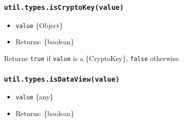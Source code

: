 \begin{Shaded}
\begin{Highlighting}[]
\NormalTok{(}\NormalTok{)}\OperatorTok{;} 
\NormalTok{(} \NormalTok{(}\NormalTok{))}\OperatorTok{;} 
\NormalTok{(}\NormalTok{(}\NormalTok{))}\OperatorTok{;} 
\NormalTok{(}\NormalTok{(}\NormalTok{(}\NormalTok{)))}\OperatorTok{;} 
\NormalTok{(}\NormalTok{(}\NormalTok{(}\NormalTok{)))}\OperatorTok{;} 
\end{Highlighting}
\end{Shaded}

\subsubsection{\texorpdfstring{\texttt{util.types.isCryptoKey(value)}}{util.types.isCryptoKey(value)}}\label{util.types.iscryptokeyvalue}

\begin{itemize}
\tightlist
\item
  \texttt{value} \{Object\}
\item
  Returns: \{boolean\}
\end{itemize}

Returns \texttt{true} if \texttt{value} is a \{CryptoKey\},
\texttt{false} otherwise.

\subsubsection{\texorpdfstring{\texttt{util.types.isDataView(value)}}{util.types.isDataView(value)}}\label{util.types.isdataviewvalue}

\begin{itemize}
\tightlist
\item
  \texttt{value} \{any\}
\item
  Returns: \{boolean\}
\end{itemize}

